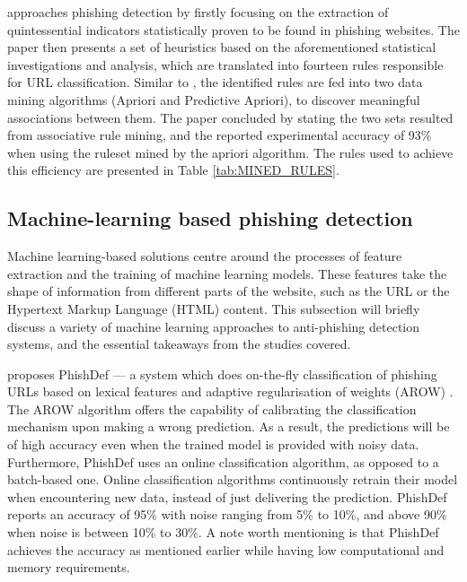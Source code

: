 \cite{Jeeva} approaches phishing detection by firstly focusing on the extraction of quintessential indicators statistically proven to be found in phishing websites. The paper then presents a set of heuristics based on the aforementioned statistical investigations and analysis, which are translated into fourteen rules responsible for URL classification. Similar to \cite{Rami_Mohammad}, the identified rules are fed into two data mining algorithms (Apriori and Predictive Apriori), to discover meaningful associations between them. The paper concluded by stating the two sets resulted from associative rule mining, and the reported experimental accuracy of 93\% when using the ruleset mined by the apriori algorithm. The rules used to achieve this efficiency are presented in Table \ref{tab:MINED_RULES}.

\subsection{Machine-learning based phishing detection}
\label{subsec:machine-learning_based_phishing_detection}
Machine learning-based solutions centre around the processes of feature extraction and the training of machine learning models. These features take the shape of information from different parts of the website, such as the URL or the Hypertext Markup Language (HTML) content. This subsection will briefly discuss a variety of machine learning approaches to anti-phishing detection systems, and the essential takeaways from the
studies covered.

\cite{Le} proposes PhishDef --- a system which does on-the-fly classification of phishing URLs based on lexical features and adaptive
regularisation of weights (AROW) \citep{AROW}. The AROW algorithm offers the capability of calibrating the classification mechanism upon making a wrong prediction. As a result, the predictions will be of high accuracy even when the trained model is provided with noisy data. Furthermore, PhishDef uses an online classification algorithm, as opposed to a batch-based one. Online classification algorithms continuously retrain their model when encountering new data, instead
of just delivering the prediction. PhishDef reports an accuracy of 95\% with noise ranging from 5\% to 10\%, and above 90\% when noise is between 10\% to 30\%. A note worth mentioning is that PhishDef achieves the accuracy as mentioned earlier while having low computational and memory requirements.


